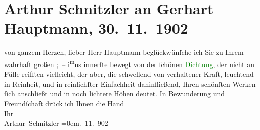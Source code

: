 

               \section[Arthur Schnitzler an Gerhart Hauptmann, 30. 11. 1902]{ Arthur Schnitzler an Gerhart Hauptmann, 30. 11. 1902}\nopagebreak{}\rehead{ }\normalsize\beginnumbering{} \toendnotes[C]{\smallbreak\pagebreak[2]} 
\toendnotes[C]{\smallbreak}\pstart
           \noindent{}{\pb}von ganzem Herzen, lieber Herr
                        Hauptmann beglückwünſche ich Sie zu Ihrem wahrhaft großen \label{K_L01254_1v}\label{K_L01254_1h}; – i\substVorne{}\textsuperscript{m}\substDazwischen{}ns\substHinten{} innerſte bewegt von der ſchönen \textcolor{green}{Dichtung}{}, der nicht an Fülle reifſten vielleicht, der
                    aber, die schwellend von verhaltener Kraft, leuchtend in Reinheit, und in
                    reinlichſter {\pb}Einfachheit dahinfließend,
                    Ihren schönſten Werken ſich anschließt und in noch lichtere Höhen deutet.\pend
           \pstart
           In Bewunderung und Freundſchaft drück ich Ihnen die Hand{\\[\baselineskip]}Ihr{\\[\baselineskip]}\spacefill\mbox{Arthur Schnitzler}\pend
           \leftskip=0em{}. 11. 902\pend
           \endnumbering{}  
      